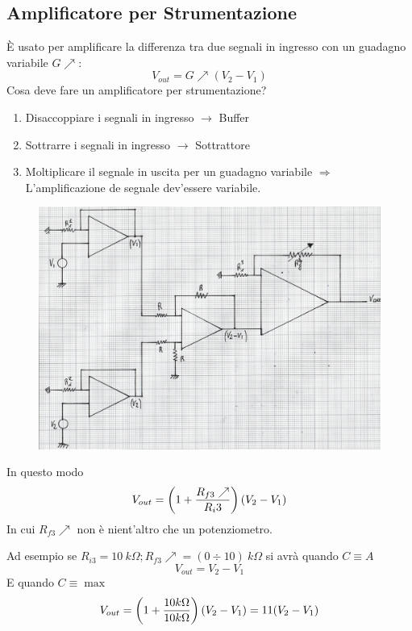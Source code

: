 \documentclass[a4paper, 15pt]{article}
\begin{document}
\subsection{Amplificatore per Strumentazione}
\begin{adjustwidth}{2in}{} 		
   		È usato per amplificare la differenza tra due segnali in ingresso con un guadagno variabile $G\nearrow$:
   		\[V_{out} = G\nearrow(V_2-V_1)\] 
   		Cosa deve fare un amplificatore per strumentazione?
   		\begin{enumerate}
   			\item Disaccoppiare i segnali in ingresso $\rightarrow$ Buffer
   			\item Sottrarre i segnali in ingresso $\rightarrow$ Sottrattore
   			\item Moltiplicare il segnale in uscita per un guadagno variabile $\Rightarrow$ L'amplificazione de segnale dev'essere variabile. 
   		\end{enumerate}  	
\begin{figure}[H]
	\centering
	\includegraphics[width=0.5\linewidth]{immagini/mm(19)}
	\label{fig:mm19}
\end{figure}  		
   		In questo modo
   		\[V_{out} = \left(1 + {R_{f3}\nearrow\over R_i3}\right)(V_2-V_1)\]
   		In cui $ R_{f3}\nearrow $ non è nient'altro che un potenziometro. \newline

   		Ad esempio se $R_{i3} = 10 ~ k\Omega; R_{f3}\nearrow = (0\div10) ~ k\Omega$ si avrà quando $C\equiv A$
   		\[V_{out} = V_2 - V_1\] E quando $C\equiv\max$  \[V_{out} = \left(1 + {10 k\Omega\over 10 k\Omega}\right)(V_2-V_1) = 11(V_2-V_1)\]
\end{adjustwidth}
\end{document}
